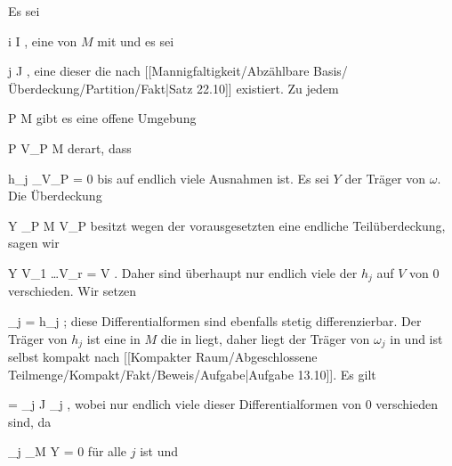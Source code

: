 {

\teilbeweis {}{}{}
{Es sei

 {}
 {i \in I} {}
 {} {} {} {,}
eine
von $M$ mit
und es sei

 {}
 {j \in J} {}
 {} {} {} {,}
eine dieser
die nach
[[Mannigfaltigkeit/Abzählbare Basis/Überdeckung/Partition/Fakt|Satz 22.10]]
existiert. Zu jedem

\mavergleichskette
{\vergleichskette
{ P
}
{ \in }{ M
}
{  }{
}
{    }{
}
{   }{
}
}
{}{}{}
gibt es eine offene Umgebung

\mavergleichskette
{\vergleichskette
{ P
}
{ \in }{ V_P
}
{ \subseteq }{ M
}
{    }{
}
{   }{
}
}
{}{}{}
derart, dass

\mavergleichskette
{\vergleichskette
{ h_j \vert_{V_P }
}
{ = }{ 0
}
{  }{
}
{    }{
}
{   }{
}
}
{}{}{}
bis auf endlich viele Ausnahmen ist. Es sei $Y$ der Träger von $\omega$. Die Überdeckung

\mavergleichskette
{\vergleichskette
{ Y
}
{ \subseteq }{ \bigcup_{P \in M} V_P
}
{  }{
}
{    }{
}
{   }{
}
}
{}{}{}
besitzt wegen der vorausgesetzten
eine endliche Teilüberdeckung, sagen wir

\mavergleichskettedisp
{\vergleichskette
{ Y
}
{ \subseteq} { V_{1} \cup \ldots \cup V_{r}
}
{ =} { V
}
{ } {
}
{ } {
}
}
{}{}{.}
Daher sind überhaupt nur endlich viele der $h_j$ auf $V$ von $0$ verschieden. Wir setzen

\mavergleichskette
{\vergleichskette
{ \omega_j
}
{ = }{ h_j \omega
}
{  }{
}
{    }{
}
{   }{
}
}
{}{}{;}
diese Differentialformen sind ebenfalls stetig differenzierbar. Der Träger von $h_j$ ist eine in $M$
die in
 liegt, daher liegt der Träger von $\omega_j$ in
 und ist selbst kompakt nach
[[Kompakter Raum/Abgeschlossene Teilmenge/Kompakt/Fakt/Beweis/Aufgabe|Aufgabe 13.10]].
Es gilt

\mavergleichskettedisp
{\vergleichskette
{ \omega
}
{ =} { \sum_{j \in J} \omega_j
}
{ } {
}
{ } {
}
{ } {
}
}
{}{}{,}
wobei nur endlich viele dieser Differentialformen
 von $0$ verschieden sind, da

\mavergleichskette
{\vergleichskette
{ \omega_j \vert_{M \setminus Y}
}
{ = }{ 0
}
{  }{
}
{    }{
}
{   }{
}
}
{}{}{}
für alle $j$ ist und

}}
